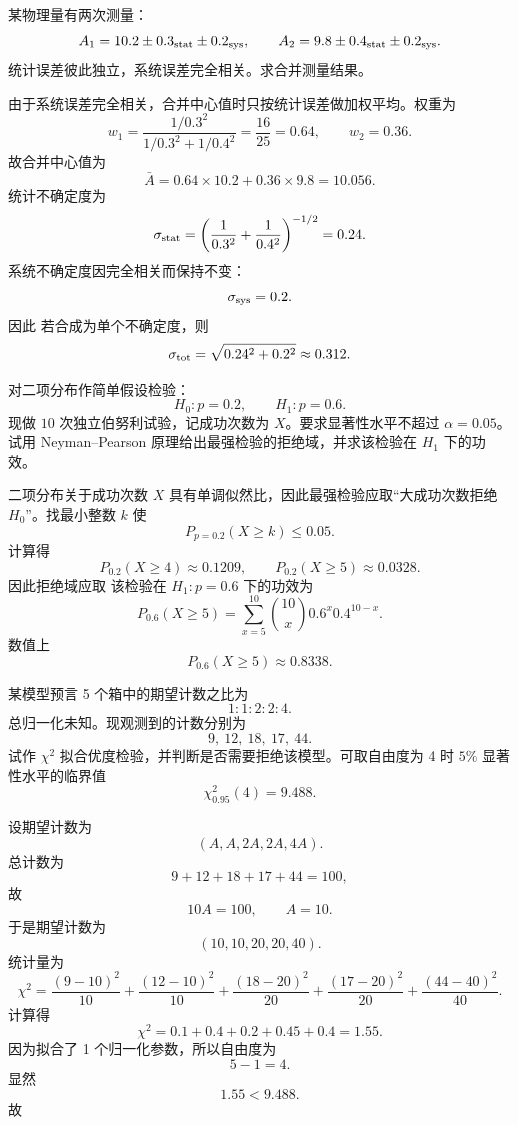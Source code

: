 \begin{question}
某物理量有两次测量：
\[
A_1=10.2\pm 0.3_{\rm stat}\pm 0.2_{\rm sys},
\qquad
A_2=9.8\pm 0.4_{\rm stat}\pm 0.2_{\rm sys}.
\]
统计误差彼此独立，系统误差完全相关。求合并测量结果。
\begin{solution}
由于系统误差完全相关，合并中心值时只按统计误差做加权平均。权重为
\[
w_1=\frac{1/0.3^2}{1/0.3^2+1/0.4^2}=\frac{16}{25}=0.64,
\qquad w_2=0.36.
\]
故合并中心值为
\[
\bar A=0.64\times 10.2+0.36\times 9.8=10.056.
\]
统计不确定度为
\[
\sigma_{\rm stat}=\left(\frac1{0.3^2}+\frac1{0.4^2}\right)^{-1/2}=0.24.
\]
系统不确定度因完全相关而保持不变：
\[
\sigma_{\rm sys}=0.2.
\]
因此
若合成为单个不确定度，则
\[
\sigma_{\rm tot}=\sqrt{0.24^2+0.2^2}\approx 0.312.
\]
\end{solution}
\end{question}

\begin{question}
对二项分布作简单假设检验：
\[
H_0:p=0.2,
\qquad
H_1:p=0.6.
\]
现做 $10$ 次独立伯努利试验，记成功次数为 $X$。要求显著性水平不超过 $\alpha=0.05$。试用 Neyman--Pearson 原理给出最强检验的拒绝域，并求该检验在 $H_1$ 下的功效。
\begin{solution}
二项分布关于成功次数 $X$ 具有单调似然比，因此最强检验应取“大成功次数拒绝 $H_0$”。找最小整数 $k$ 使
\[
P_{p=0.2}(X\ge k)\le 0.05.
\]
计算得
\[
P_{0.2}(X\ge 4)\approx 0.1209,
\qquad
P_{0.2}(X\ge 5)\approx 0.0328.
\]
因此拒绝域应取
该检验在 $H_1:p=0.6$ 下的功效为
\[
P_{0.6}(X\ge 5)=\sum_{x=5}^{10}\binom{10}{x}0.6^x0.4^{10-x}.
\]
数值上
\[
P_{0.6}(X\ge 5)\approx 0.8338.
\]
\end{solution}
\end{question}

\begin{question}
某模型预言 5 个箱中的期望计数之比为
\[
1:1:2:2:4.
\]
总归一化未知。现观测到的计数分别为
\[
9,\ 12,\ 18,\ 17,\ 44.
\]
试作 $\chi^2$ 拟合优度检验，并判断是否需要拒绝该模型。可取自由度为 4 时 $5\%$ 显著性水平的临界值
\[
\chi^2_{0.95}(4)=9.488.
\]
\begin{solution}
设期望计数为
\[
(A,A,2A,2A,4A).
\]
总计数为
\[
9+12+18+17+44=100,
\]
故
\[
10A=100,
\qquad A=10.
\]
于是期望计数为
\[
(10,10,20,20,40).
\]
统计量为
\[
\chi^2=\frac{(9-10)^2}{10}+\frac{(12-10)^2}{10}+\frac{(18-20)^2}{20}+\frac{(17-20)^2}{20}+\frac{(44-40)^2}{40}.
\]
计算得
\[
\chi^2=0.1+0.4+0.2+0.45+0.4=1.55.
\]
因为拟合了 1 个归一化参数，所以自由度为
\[
5-1=4.
\]
显然
\[
1.55<9.488.
\]
故
\end{solution}
\end{question}

